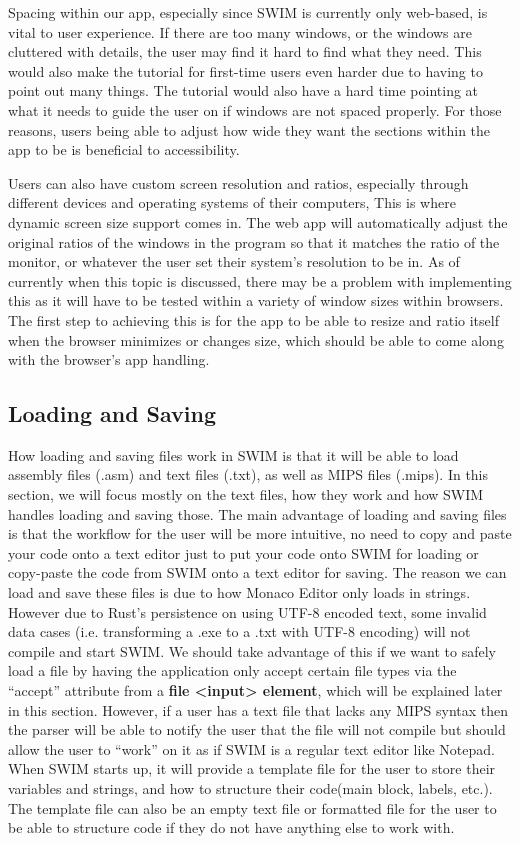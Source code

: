 \documentclass[
    paper=letter,
    parskip=half,
    fontsize=12pt,
    titlepage=firstiscover,
    toc=bibliography,
    numbers=endperiod
]{scrartcl}
\begin{document}
Spacing within our app, especially since SWIM is currently only
web-based, is vital to user experience. If there are too many windows,
or the windows are cluttered with details, the user may find it hard to
find what they need. This would also make the tutorial for first-time
users even harder due to having to point out many things. The tutorial
would also have a hard time pointing at what it needs to guide the user
on if windows are not spaced properly. For those reasons, users being
able to adjust how wide they want the sections within the app to be is
beneficial to accessibility.

Users can also have custom screen resolution and ratios, especially
through different devices and operating systems of their computers, This
is where dynamic screen size support comes in. The web app will
automatically adjust the original ratios of the windows in the program
so that it matches the ratio of the monitor, or whatever the user set
their system's resolution to be in. As of currently when this topic is
discussed, there may be a problem with implementing this as it will have
to be tested within a variety of window sizes within browsers. The first
step to achieving this is for the app to be able to resize and ratio
itself when the browser minimizes or changes size, which should be able
to come along with the browser's app handling.

\subsection{Loading and Saving}

How loading and saving files work in SWIM is that it will be able to
load assembly files (.asm) and text files (.txt), as well as MIPS files
(.mips). In this section, we will focus mostly on the text files, how
they work and how SWIM handles loading and saving those. The main
advantage of loading and saving files is that the workflow for the user
will be more intuitive, no need to copy and paste your code onto a text
editor just to put your code onto SWIM for loading or copy-paste the
code from SWIM onto a text editor for saving. The reason we can load and
save these files is due to how Monaco Editor only loads in strings.
However due to Rust's persistence on using UTF-8 encoded text, some
invalid data cases (i.e. transforming a .exe to a .txt with UTF-8
encoding) will not compile and start SWIM.
We should take advantage of
this if we want to safely load a file by having the application only
accept certain file types via the ``accept'' attribute from a
\textbf{file \textless input\textgreater{} element}, which will be
explained later in this section. However, if a user has a text file that
lacks any MIPS syntax then the parser will be able to notify the user
that the file will not compile but should allow the user to ``work'' on
it as if SWIM is a regular text editor like Notepad. When SWIM starts
up, it will provide a template file for the user to store their
variables and strings, and how to structure their code(main block,
labels, etc.). The template file can also be an empty text file or
formatted file for the user to be able to structure code if they do not
have anything else to work with.
\end{document}
